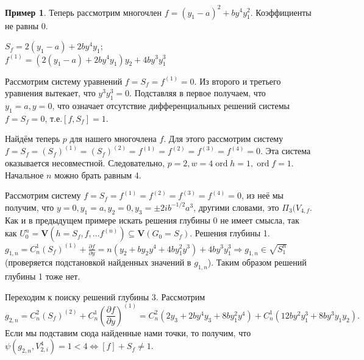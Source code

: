 \documentclass[16pt]{article}
\DeclareMathOperator{\ord}{ord}
\theoremstyle{plain1}
\theoremstyle{plain2}
\theoremstyle{plain}
\theoremstyle{plain3}
\theoremstyle{definition}
\newtheorem{example}[theorem3]{Пример}
\theoremstyle{remark}
\begin{document}
\begin{example}
 Теперь рассмотрим многочлен $f =
(y_1-a)^2+by^4y_1^2$. Коэффициенты не равны 0.

$S_f=2(y_1-a)+2by^4y_1$;
\\
$f^{(1)}=(2(y_1-a)+2by^4y_1)y_2+4by^3y_1^3$

Рассмотрим систему уравнений $f=S_f=f^{(1)}=0$. Из второго и
третьего уравнения вытекает, что $y^3y_1^3=0$. Подставляя в первое
получаем, что $y_1=a, y=0$, что означает отсутствие дифференциальных
решений системы $f=S_f=0$, т.е.$[f,S_f]=1$.

Найдём теперь  $p$ для нашего многочлена $f$. Для этого рассмотрим
систему $f=S_f=(S_f)^{(1)}=(S_f)^{(2)}=f^{(1)}=f^{(2)}=f^{(3)}=f^{(4)}=0$. Эта система оказывается несовместной. Следовательно,
$p=2,w=4\ord{h}=1,\ord{f}=1$. Начальное $n$  можно брать равным 4.

Рассмотрим систему $f=S_f=f^{(1)}=f^{(2)}=f^{(3)}=f^{(4)}=0$, из неё мы получим, что $y=0,y_1=a,y_2=0,y_3=\pm2ib^{-1/2}a^3$, другими словами, это $\Pi_3({V}_{4,f}$. 
Как и в предыдущем примере искать решения глубины 0 не имеет смысла, так как ${U}_0^n = \mathbf{V}(h=S_f,f,\ldots f^{(n)})\subseteq\mathbf{V}(G_0=S_f)$.  Решения глубины 1. $g_{1,n}=C_n^1(S_f)^{(1)}+\frac{\partial f}{\partial y}=n(y_2+by_2y^4+4by_1^2y^3)+4by^3y_1^3\Rightarrow g_{1,n}\in\sqrt{S_1^n}$ (проверяется подстановкой найденных значений в $g_{1,n}$).  Таким образом решений глубины 1 тоже нет.

Переходим к поиску решений глубины 3. Рассмотрим $$g_{2,n}=C_n^2(S_f)^{(2)}+C_n^1\left(\frac{\partial
f}{\partial
y}\right)^{(1)}=C_n^2(2y_3+2by^4y_3+8by_1^2y^4)+C_n^1(12by^2y_1^3+8by^3y_1y_2).$$
Если мы подставим сюда найденные нами точки, то получим, что
$\psi(g_{2,n},{V}_{2,i}^4)= 1 <4\Leftrightarrow [f]+S_f\not=1.$


\end{example}
\end{document}
